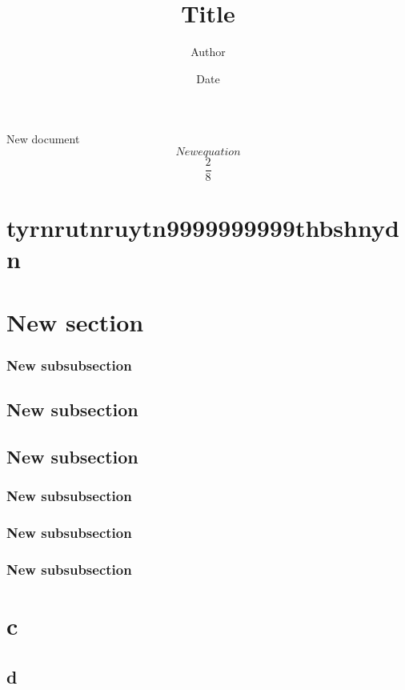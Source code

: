 \documentclass{article}
\begin{document}
\title{Title}
\author{Author}
\date{Date}
\maketitle
New document
\begin{equation} New equation \end{equation}
\begin{equation} \frac{2}{8} \end{equation}
\section{\textnormal{tyrnrutnruytn999\textbf{9999999thbshnydn}}}
\tableofcontents
\section{\textnormal{New section}}
\subsubsection{\textnormal{New subsubsection}}
\subsection{\textnormal{New subsection}}
\subsection{\textnormal{New subsection}}
\subsubsection{\textnormal{New subsubsection}}
\subsubsection{\textnormal{New subsubsection}}
\subsubsection{\textnormal{New subsubsection}}
\newpage
\section{\textnormal{c}}
\subsection{\textnormal{d}}
\end{document}
